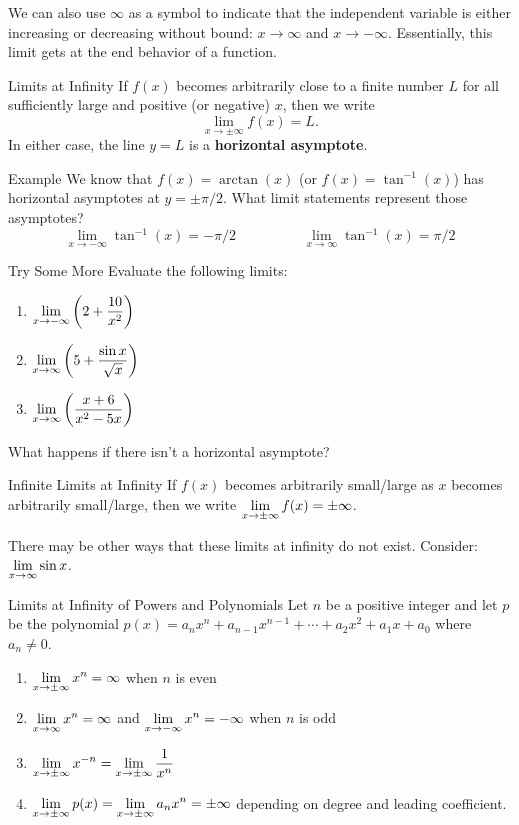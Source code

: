 
We can also use $\infty$ as a symbol to indicate that the independent variable is either increasing or decreasing without bound: $x\to\infty$ and $x\to-\infty$. Essentially, this limit gets at the end behavior of a function.

\begin{defn}{Limits at Infinity}
If $f(x)$ becomes arbitrarily close to a finite number $L$ for all sufficiently large and positive (or negative) $x$, then we write
\[ \lim_{x\to\pm\infty}f(x)=L.\]
In either case, the line $y=L$ is a \textbf{horizontal asymptote}.
\end{defn}

\begin{note}{Example}
We know that $f(x)=\arctan(x)$ (or $f(x)=\tan^{-1}(x)$) has horizontal asymptotes at $y=\pm \pi/2$. What limit statements represent those asymptotes?
\[\lim_{x\to-\infty}\tan^{-1}(x)=-\pi/2 \hspace{2cm} \lim_{x\to\infty}\tan^{-1}(x)=\pi/2\]
\end{note}

\begin{note}{Try Some More}
Evaluate the following limits:
\begin{multicols}{3}
\begin{enumerate}
  \item $\displaystyle \lim_{x\to-\infty} \left( 2+\dfrac{10}{x^2}\right)$
  \item $\displaystyle \lim_{x\to\infty} \left(5+\dfrac{\sin x}{\sqrt{x}}\right)$
  \item $\displaystyle \lim_{x\to\infty} \left(\dfrac{x+6}{x^2-5x}\right)$
\end{enumerate}
\end{multicols}
\end{note}

What happens if there isn't a horizontal asymptote?

\begin{defn}{Infinite Limits at Infinity}
If $f(x)$ becomes arbitrarily small/large as $x$ becomes arbitrarily small/large, then we write $\displaystyle \lim_{x\to\pm\infty}f(x)=\pm\infty$.
\end{defn}

There may be other ways that these limits at infinity do not exist. Consider: $\displaystyle \lim_{x\to\infty} \sin x$.

\begin{thm}{Limits at Infinity of Powers and Polynomials}
Let $n$ be a positive integer and let $p$ be the polynomial $p(x)=a_nx^n+a_{n-1}x^{n-1}+\cdots+a_2x^2+a_1x+a_0$ where $a_n\neq0$.
\begin{enumerate}
  \item $\displaystyle \lim_{x\to\pm\infty}x^n=\infty$ when $n$ is even
  \item $\displaystyle \lim_{x\to\infty}x^n=\infty$ and $\displaystyle \lim_{x\to-\infty}x^n=-\infty$ when $n$ is odd
  \item $\displaystyle \lim_{x\to\pm\infty}x^{-n}=\displaystyle \lim_{x\to\pm\infty}\dfrac{1}{x^n}$
  \item $\displaystyle \lim_{x\to\pm\infty} p(x)=\displaystyle \lim_{x\to\pm\infty} a_nx^n = \pm\infty$ depending on degree and leading coefficient.
\end{enumerate}

\end{thm}


